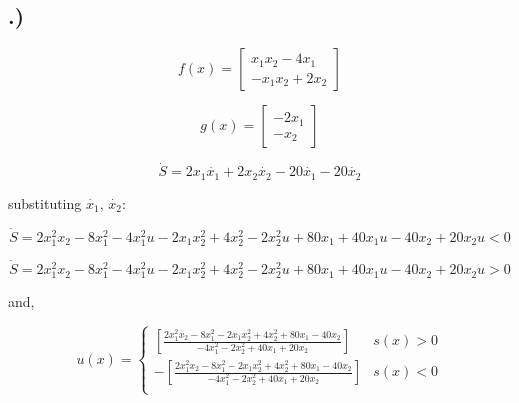 \documentclass[10pt, letterpaper]{article}
\begin{document}
\subsection{.)}

\[
f(x) = \left[\begin{matrix}
x_{1}x_{2} - 4x_{1}\\
-x_{1}x_{2} + 2x_{2}
\end{matrix}\right]
\]

\[
g(x) = \left[\begin{matrix}
-2x_{1}\\
-x_{2}
\end{matrix}\right]
\]

\[
\dot{S} = 2x_{1}\dot{x_{1}} + 2x_{2}\dot{x_{2}} - 20\dot{x_{1}} - 20\dot{x_{2}}
\]

substituting $\dot{x_{1}}$, $\dot{x_{2}}$:

\[
\dot{S} = 2x_{1}^{2}x_{2} - 8x_{1}^{2}-4x_{1}^{2}u -2x_{1}x_{2}^{2} + 4x_{2}^{2} -2x_{2}^{2}u + 80x_{1} + 40x_{1}u-40x_{2}+20x_{2}u < 0
\]

\[
\dot{S} = 2x_{1}^{2}x_{2} - 8x_{1}^{2}-4x_{1}^{2}u -2x_{1}x_{2}^{2} + 4x_{2}^{2} -2x_{2}^{2}u + 80x_{1} + 40x_{1}u-40x_{2}+20x_{2}u > 0
\]

and,


\[ u(x) = \begin{cases} 
      [\frac{2x_{1}^{2}x_{2} - 8x_{1}^{2}-2x_{1}x_{2}^{2} + 4x_{2}^{2} + 80x_{1}-40x_{2}}{-4x_{1}^{2}-2x_{2}^{2}+40x_{1}+20x_{2}}] & s(x) > 0\\
      -[\frac{2x_{1}^{2}x_{2} - 8x_{1}^{2}-2x_{1}x_{2}^{2} + 4x_{2}^{2} + 80x_{1}-40x_{2}}{-4x_{1}^{2}-2x_{2}^{2}+40x_{1}+20x_{2}}] & s(x) < 0\\
   \end{cases}
\]
\end{document}
